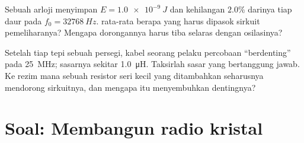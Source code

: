 \begin{exercise}[$\star\star\star$]\label{exo:g12:rlc-oscillations:14}
Sebuah  arloji menyimpan $E = \qty{1.0e-9}{J}$ dan kehilangan $2.0\%$
darinya tiap daur pada $f_0 = \qty{32768}{Hz}$.  rata-rata berapa yang harus
dipasok sirkuit pemeliharanya? Mengapa dorongannya harus tiba selaras
dengan osilasinya?
\end{exercise}

\begin{exercise}[$\star\star\star$]\label{exo:g12:rlc-oscillations:15}
Setelah tiap tepi sebuah  persegi, kabel seorang pelaku percobaan ``berdenting''
pada \qty{25}{MHz};  sasarnya sekitar \qty{1.0}{\micro H}.
Taksirlah  sasar yang bertanggung jawab. Ke rezim mana sebuah resistor
seri kecil yang ditambahkan seharusnya mendorong sirkuitnya, dan mengapa itu
menyembuhkan dentingnya?
\end{exercise}

\section{Soal: Membangun radio kristal}

